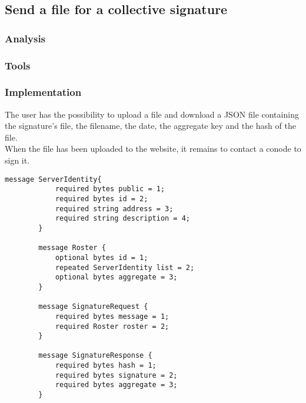 \documentclass[11pt, a4paper, twoside, openright]{book} %
\begin{document}
\subsection{Send a file for a collective signature}
\subsubsection{Analysis}



\subsubsection{Tools}


\subsubsection{Implementation}
The user has the possibility to upload a file and download a JSON file containing
the signature's file, the filename, the date, the aggregate key and the hash of the file.\\
When the file has been uploaded to the website, it remains to contact a conode to sign it.\\
\begin{lstlisting}[caption={.proto file}, captionpos=b]
  message ServerIdentity{
            required bytes public = 1;
            required bytes id = 2;
            required string address = 3;
            required string description = 4;
        }

        message Roster {
            optional bytes id = 1;
            repeated ServerIdentity list = 2;
            optional bytes aggregate = 3;
        }

        message SignatureRequest {
            required bytes message = 1;
            required Roster roster = 2;
        }

        message SignatureResponse {
            required bytes hash = 1;
            required bytes signature = 2;
            required bytes aggregate = 3;
        }
\end{lstlisting}
\leavevmode \\





{}

\end{document}
